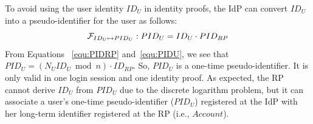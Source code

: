 To avoid using the user identity $ID_U$ in identity proofs, the IdP can convert $ID_U$ into a pseudo-identifier for the user as follows:
\begin{equation}
\setlength{\abovedisplayskip}{3pt}
\setlength{\belowdisplayskip}{3pt}
 \mathcal{F}_{ID_{U} \mapsto PID_{U}}: PID_U = {ID_U} \cdot {PID_{RP}}
 \label{equ:PIDU}
\end{equation}
From Equations%
~\ref{equ:PIDRP} and~\ref{equ:PIDU}, we see that $PID_U = ({N_UID_U} \bmod n) \cdot {ID_{RP}}$. So, $PID_U$ is a one-time pseudo-identifier. It is only valid in one login session and one identity proof.
As expected, the RP cannot derive $ID_U$ from $PID_U$ due to the discrete logarithm problem, but it can associate a user's one-time pseudo-identifier ($PID_U$) registered at the IdP with her long-term identifier registered at the RP (i.e., $Account$).





